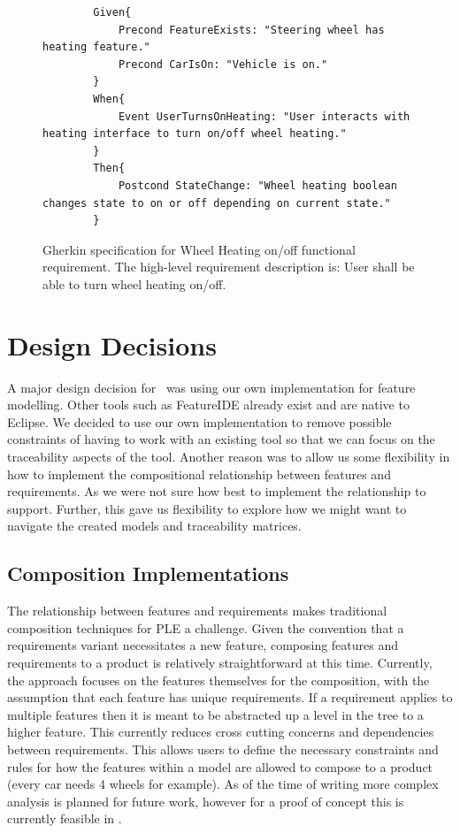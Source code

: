 \begin{figure}
	\begin{lstlisting}
		Given{
			Precond FeatureExists: "Steering wheel has heating feature."
			Precond CarIsOn: "Vehicle is on."
		}
		When{
			Event UserTurnsOnHeating: "User interacts with heating interface to turn on/off wheel heating."
		}
		Then{
			Postcond StateChange: "Wheel heating boolean changes state to on or off depending on current state."
		}
	\end{lstlisting}
	\caption{Gherkin specification for Wheel Heating on/off functional requirement. The high-level requirement description is: User shall be able to turn wheel heating on/off.}
	\label{fig:specification}
\end{figure}

\section{Design Decisions}

A major design decision for \tool\ was using our own implementation for feature modelling. Other tools such as FeatureIDE already exist and are native to Eclipse. We decided to use our own implementation to remove possible constraints of having to work with an existing tool so that we can focus on the traceability aspects of the tool. Another reason was to allow us some flexibility in how to implement the compositional relationship between features and requirements. As we were not sure how best to implement the relationship to support. Further, this gave us flexibility to explore how we might want to navigate the created models and traceability matrices. 






\subsection{Composition Implementations}

The relationship between features and requirements makes traditional composition techniques for \ac{PLE} a challenge. Given the convention that a requirements variant necessitates a new feature, composing features and requirements to a product is relatively straightforward at this time. Currently, the approach focuses on the features themselves for the composition, with the assumption that each feature has unique requirements. If a requirement applies to multiple features then it is meant to be abstracted up a level in the tree to a higher feature. This currently reduces cross cutting concerns and dependencies between requirements. This allows users to define the necessary constraints and rules for how the features within a model are allowed to compose to a product (every car needs 4 wheels for example). As of the time of writing more complex analysis is planned for future work, however for a proof of concept this is currently feasible in \tool.

